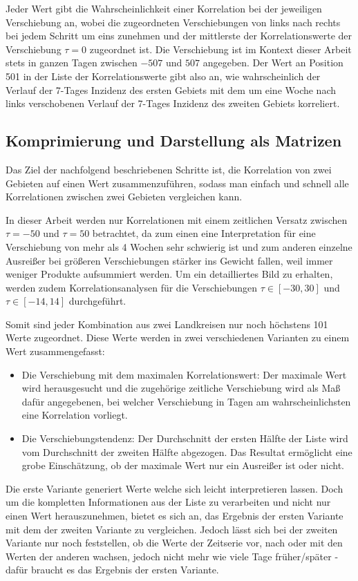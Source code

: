 Jeder Wert gibt die Wahrscheinlichkeit einer Korrelation bei der jeweiligen Verschiebung an, wobei die zugeordneten Verschiebungen von links nach rechts bei jedem Schritt um eins zunehmen und der mittlerste der Korrelationswerte der Verschiebung $\tau = 0$ zugeordnet ist. Die Verschiebung ist im Kontext dieser Arbeit stets in ganzen Tagen zwischen $-507$ und $507$ angegeben. Der Wert an Position 501 in der Liste der Korrelationswerte gibt also an, wie wahrscheinlich der Verlauf der 7-Tages Inzidenz des ersten Gebiets mit dem um eine Woche nach links verschobenen Verlauf der 7-Tages Inzidenz des zweiten Gebiets korreliert.


\subsection{Komprimierung und Darstellung als Matrizen}\label{sec:Grundlagen:Korrelation:Komprimierung}
Das Ziel der nachfolgend beschriebenen Schritte ist, die Korrelation von zwei Gebieten auf einen Wert zusammenzuführen, sodass man einfach und schnell alle Korrelationen zwischen zwei Gebieten vergleichen kann.

In dieser Arbeit werden nur Korrelationen mit einem zeitlichen Versatz zwischen $\tau=-50$ und $\tau=50$ betrachtet, da zum einen eine Interpretation für eine Verschiebung von mehr als 4 Wochen sehr schwierig ist und zum anderen einzelne Ausreißer bei größeren Verschiebungen stärker ins Gewicht fallen, weil immer weniger Produkte aufsummiert werden.
Um ein detailliertes Bild zu erhalten, werden zudem Korrelationsanalysen für die Verschiebungen $\tau\in[-30,30]$ und $\tau\in[-14,14]$ durchgeführt.

Somit sind jeder Kombination aus zwei Landkreisen nur noch höchstens 101 Werte zugeordnet. Diese Werte werden in zwei verschiedenen Varianten zu einem Wert zusammengefasst:
\begin{itemize}
    \item Die Verschiebung mit dem maximalen Korrelationswert: Der maximale Wert wird herausgesucht und die zugehörige zeitliche Verschiebung wird als Maß dafür angegebenen, bei welcher Verschiebung in Tagen am wahrscheinlichsten eine Korrelation vorliegt.
    \item Die Verschiebungstendenz: Der Durchschnitt der ersten Hälfte der Liste wird vom Durchschnitt der zweiten Hälfte abgezogen. Das Resultat ermöglicht eine grobe Einschätzung, ob der maximale Wert nur ein Ausreißer ist oder nicht.
\end{itemize}
Die erste Variante generiert Werte welche sich leicht interpretieren lassen. Doch um die kompletten Informationen aus der Liste zu verarbeiten und nicht nur einen Wert herauszunehmen, bietet es sich an, das Ergebnis der ersten Variante mit dem der zweiten Variante zu vergleichen.
Jedoch lässt sich bei der zweiten Variante nur noch feststellen, ob die Werte der Zeitserie vor, nach oder mit den Werten der anderen wachsen, jedoch nicht mehr wie viele Tage früher/später - dafür braucht es das Ergebnis der ersten Variante.

